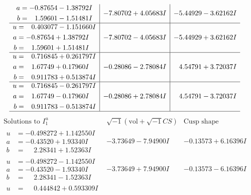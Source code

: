 \documentclass[1p]{elsarticle_modified}
\theoremstyle{definition}
\newcommand{\I}{\sqrt{-1}}
\begin{document}
$$\begin{array}{c|c|c}
\begin{aligned}
a &= -0.87654 - 1.38792 I \\
b &= \phantom{-}1.59601 - 1.51481 I\end{aligned}
 & -7.80702 + 4.05683 I & -5.44929 - 3.62162 I \\ \hline\begin{aligned}
u &= \phantom{-}0.403077 - 1.151660 I \\
a &= -0.87654 + 1.38792 I \\
b &= \phantom{-}1.59601 + 1.51481 I\end{aligned}
 & -7.80702 - 4.05683 I & -5.44929 + 3.62162 I \\ \hline\begin{aligned}
u &= \phantom{-}0.716845 + 0.261797 I \\
a &= \phantom{-}1.67749 + 0.17960 I \\
b &= \phantom{-}0.911783 + 0.513874 I\end{aligned}
 & -0.28086 - 2.78084 I & \phantom{-}4.54791 + 3.72037 I \\ \hline\begin{aligned}
u &= \phantom{-}0.716845 - 0.261797 I \\
a &= \phantom{-}1.67749 - 0.17960 I \\
b &= \phantom{-}0.911783 - 0.513874 I\end{aligned}
 & -0.28086 + 2.78084 I & \phantom{-}4.54791 - 3.72037 I\\
 \hline 
 \end{array}$$\newpage$$\begin{array}{c|c|c}  
\text{Solutions to }I^u_{1}& \I (\text{vol} + \sqrt{-1}CS) & \text{Cusp shape}\\
 \hline 
\begin{aligned}
u &= -0.498272 + 1.142550 I \\
a &= -0.43520 + 1.93340 I \\
b &= \phantom{-}2.28341 + 1.52363 I\end{aligned}
 & -3.73649 - 7.94900 I & -0.13573 + 6.16396 I \\ \hline\begin{aligned}
u &= -0.498272 - 1.142550 I \\
a &= -0.43520 - 1.93340 I \\
b &= \phantom{-}2.28341 - 1.52363 I\end{aligned}
 & -3.73649 + 7.94900 I & -0.13573 - 6.16396 I \\ \hline\begin{aligned}
u &= \phantom{-}0.444842 + 0.593309 I \\

\end{aligned}
\end{array}$$
\end{document}
